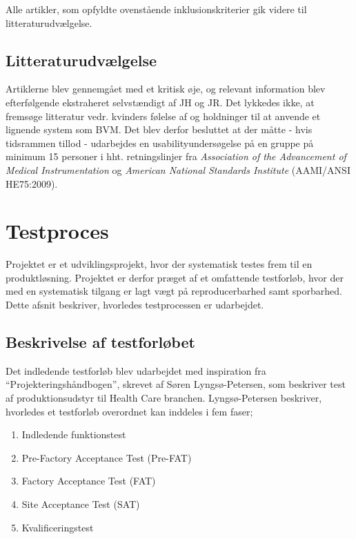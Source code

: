 	Alle artikler, som opfyldte ovenstående inklusionskriterier gik videre til litteraturudvælgelse. 	
		
	\subsection{Litteraturudvælgelse}	
	Artiklerne blev gennemgået med et kritisk øje, og relevant information blev efterfølgende ekstraheret selvstændigt af JH og JR. Det lykkedes ikke, at fremsøge litteratur vedr. kvinders følelse af og holdninger til at anvende et lignende system som BVM. Det blev derfor besluttet at der måtte - hvis tidsrammen tillod - udarbejdes en usabilityundersøgelse på en gruppe på minimum 15 personer i hht. retningslinjer fra \textit{Association of the Advancement of Medical Instrumentation} og \textit{American National Standards Institute} (AAMI/ANSI HE75:2009). \\

\section{Testproces}
Projektet er et udviklingsprojekt, hvor der systematisk testes frem til en produktløsning. Projektet er derfor præget af et omfattende testforløb, hvor der med en systematisk tilgang er lagt vægt på reproducerbarhed samt sporbarhed. Dette afsnit beskriver, hvorledes testprocessen er udarbejdet. 

\subsection{Beskrivelse af testforløbet}
\label{subsec:testfor}
Det indledende testforløb blev udarbejdet med inspiration fra “Projekteringshåndbogen”, skrevet af Søren Lyngsø-Petersen, som beskriver test af produktionsudstyr til Health Care branchen. Lyngsø-Petersen beskriver, hvorledes et testforløb overordnet kan inddeles i fem faser;  

	\begin{enumerate}
		\item Indledende funktionstest
		\item Pre-Factory Acceptance Test (Pre-FAT)
		\item Factory Acceptance Test (FAT)
		\item Site Acceptance Test (SAT)
		\item Kvalificeringstest
	\end{enumerate}

